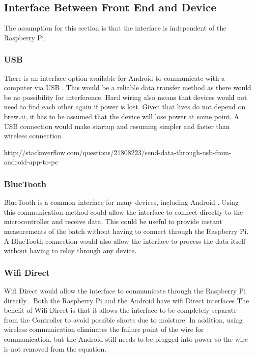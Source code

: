 \documentclass[draftclsnofoot,onecolumn,letterpaper,10pt]{IEEEtran}
\begin{document}
\subsection{Interface Between Front End and Device}
The assumption for this section is that the interface is independent of the Raspberry Pi.

\subsubsection{USB}
There is an interface option available for Android to communicate with a computer via USB \cite{USB}.
This would be a reliable data transfer method as there would be no possibility for interference.
Hard wiring also means that devices would not need to find each other again if power is lost.
Given that lives do not depend on brew.ai, it has to be assumed that the device will lose power at some point.
A USB connection would make startup and resuming simpler and faster than wireless connection.

http://stackoverflow.com/questions/21808223/send-data-through-usb-from-android-app-to-pc

\subsubsection{BlueTooth}
BlueTooth is a common interface for many devices, including Android \cite{BlueTooth}.
Using this communication method could allow the interface to connect directly to the microcontroller and receive data.
This could be useful to provide instant measurements of the batch without having to connect through the Raspberry Pi.
A BlueTooth connection would also allow the interface to process the data itself without having to relay through any device.


\subsubsection{Wifi Direct}
Wifi Direct would allow the interface to communicate through the Raspberry Pi directly \cite{PiWifiDirect}.
Both the Raspberry Pi and the Android have wifi Direct interfaces \cite{AndroidWifiDirect}
The benefit of Wifi Direct is that it allows the interface to be completely separate from the Controller to avoid possible shorts due to moisture.
In addition, using wireless communication eliminates the failure point of the wire for communication, but the Android still needs to be plugged into power so the wire is not removed from the equation.
\end{document}
